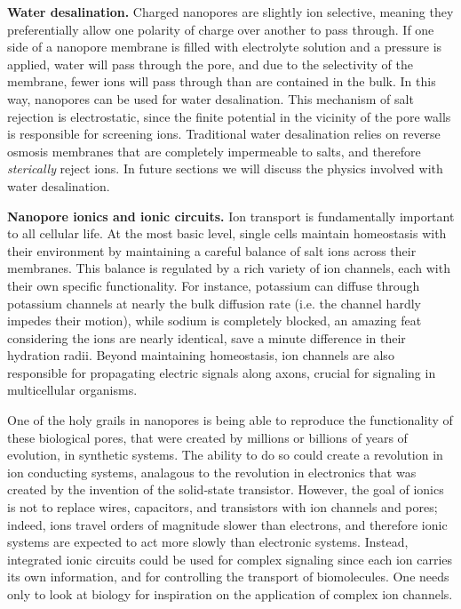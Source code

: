 			\textbf{Water desalination.} Charged nanopores are slightly ion selective, meaning they preferentially allow one polarity of charge over another to pass through. If one side of a nanopore membrane is filled with electrolyte solution and a pressure is applied, water will pass through the pore, and due to the selectivity of the membrane, fewer ions will pass through than are contained in the bulk. In this way, nanopores can be used for water desalination. This mechanism of salt rejection is electrostatic, since the finite potential in the vicinity of the pore walls is responsible for screening ions. Traditional water desalination relies on reverse osmosis membranes that are completely impermeable to salts, and therefore \textit{sterically} reject ions.  In future sections we will discuss the physics involved with water desalination.

			\textbf{Nanopore ionics and ionic circuits.} Ion transport is fundamentally important to all cellular life. At the most basic level, single cells maintain homeostasis with their environment by maintaining a careful balance of salt ions across their membranes. This balance is regulated by a rich variety of ion channels, each with their own specific functionality. For instance, potassium can diffuse through potassium channels at nearly the bulk diffusion rate (i.e. the channel hardly impedes their motion), while sodium is completely blocked, an amazing feat considering the ions are nearly identical, save a minute difference in their hydration radii. Beyond maintaining homeostasis, ion channels are also responsible for propagating electric signals along axons, crucial for signaling in multicellular organisms. 

			One of the holy grails in nanopores is being able to reproduce the functionality of these biological pores, that were created by millions or billions of years of evolution, in synthetic systems. The ability to do so could create a revolution in ion conducting systems, analagous to the revolution in electronics that was created by the invention of the solid-state transistor. However, the goal of ionics is not to replace wires, capacitors, and transistors with ion channels and pores; indeed, ions travel orders of magnitude slower than electrons, and therefore ionic systems are expected to act more slowly than electronic systems. Instead, integrated ionic circuits could be used for complex signaling since each ion carries its own information, and for controlling the transport of biomolecules. One needs only to look at biology for inspiration on the application of complex ion channels.

